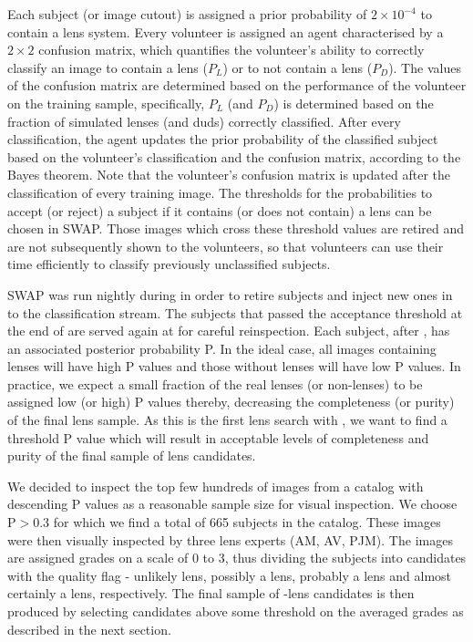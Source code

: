\documentclass[useAMS,usenatbib,a4paper]{mn2e}
\begin{document}
Each subject (or image cutout) is assigned a prior probability of
$2\times10^{-4}$ to contain a lens system. Every volunteer
is assigned an agent characterised by a $2\times2$ confusion matrix,
which quantifies the volunteer's ability to correctly classify an image
to contain a lens ($P_L$) or to not contain a lens ($P_D$). The values of
the confusion matrix are determined based on the performance of the
volunteer on the training sample, specifically, $P_L$ (and $P_D$) is
determined based on the fraction of simulated lenses (and duds)
correctly classified. After every classification, the agent updates the
prior probability of the classified subject based on the volunteer's classification
and the confusion matrix, according to the Bayes theorem.
Note that the volunteer's confusion matrix is updated after the
classification of every training image. The thresholds for the
probabilities to accept (or reject) a subject  if it contains (or does
not contain) a lens can be chosen in SWAP. Those images which cross
these threshold values are retired and are not subsequently shown to the
volunteers, so that volunteers can use their time efficiently to
classify previously unclassified subjects.

SWAP was run nightly during \StageOne in order to retire subjects and inject new
ones in to the classification stream. The subjects that passed the acceptance
threshold at the end of \StageOne are served again at \StageTwo for careful
reinspection. Each subject, after \StageTwo, has an associated posterior
probability P. In the ideal case, all images containing lenses will have high P
values and those without lenses will have low P values. In practice, we expect a
small fraction of the real lenses (or non-lenses) to be assigned low (or high) P
values thereby, decreasing the completeness (or purity) of the final lens
sample. As this is the first lens search with \sw, we want to find a
threshold P value which will result in acceptable levels of completeness and
purity of the final sample of lens candidates.

We decided to inspect the top few hundreds of images from a catalog with
descending P values as a reasonable sample size for visual inspection.
We choose P$>0.3$ for which we find a total of 665 subjects in the
catalog. These images were then visually inspected by three lens experts
(AM, AV, PJM).  The images are assigned grades on a scale of 0 to 3,
thus dividing the subjects into candidates with the quality flag -
unlikely lens, possibly a lens, probably a lens and almost certainly a
lens, respectively. The final sample of \sw-\cfhtls lens candidates is
then produced by selecting candidates above some threshold on the
averaged grades as described in the next section.
\end{document}
